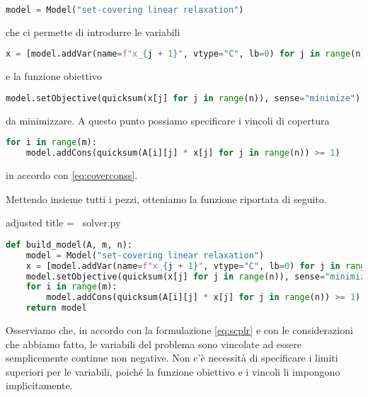 \begin{inline}
\begin{lstlisting}[style = style2, language=python]
model = Model("set-covering linear relaxation")
\end{lstlisting}
\end{inline}
\noindent
che ci permette di introdurre le variabili
\begin{inline}
\begin{lstlisting}[style = style2, language=python]
x = [model.addVar(name=f"x_{j + 1}", vtype="C", lb=0) for j in range(n)]
\end{lstlisting}
\end{inline}
\noindent
e la funzione obiettivo
\begin{inline}
\begin{lstlisting}[style = style2, language=python]
model.setObjective(quicksum(x[j] for j in range(n)), sense="minimize")
\end{lstlisting}
\end{inline}
\noindent
da minimizzare. A questo punto possiamo specificare i vincoli di copertura
\begin{inline}
\begin{lstlisting}[style = style2, language=python]
for i in range(m):
    model.addCons(quicksum(A[i][j] * x[j] for j in range(n)) >= 1)
\end{lstlisting}
\end{inline}
\noindent
in accordo con \eqref{eq:coverconss}.

Mettendo insieme tutti i pezzi, otteniamo la funzione riportata di seguito.
\begin{code}{adjusted title = {\pyicon\ solver.py}}
\begin{lstlisting}[language=python, style = style, caption={Costruzione del modello per l'algoritmo del simplesso.}]
def build_model(A, m, n):
    model = Model("set-covering linear relaxation")
    x = [model.addVar(name=f"x_{j + 1}", vtype="C", lb=0) for j in range(n)]
    model.setObjective(quicksum(x[j] for j in range(n)), sense="minimize")
    for i in range(m):
        model.addCons(quicksum(A[i][j] * x[j] for j in range(n)) >= 1)
    return model
\end{lstlisting}
\end{code}
\noindent
Osserviamo che, in accordo con la formulazione \eqref{eq:scplr} e con le considerazioni che abbiamo fatto, le variabili
del problema sono vincolate ad essere semplicemente continue non negative. Non c'è necessità di specificare i limiti
superiori per le variabili, poiché la funzione obiettivo e i vincoli li impongono implicitamente.

